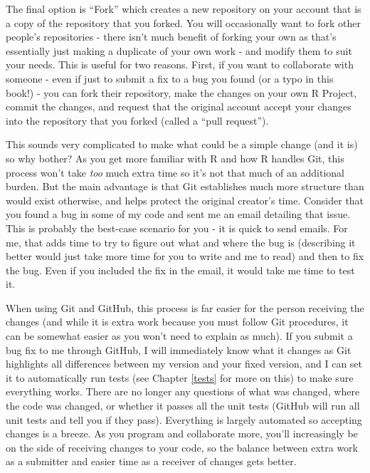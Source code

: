 \documentclass[
]{krantz}
\begin{document}
The final option is ``Fork'' which creates a new repository
on your account that is a copy of the repository that you
forked. You will occasionally want to fork other people's
repositories - there isn't much benefit of forking your own
as that's essentially just making a duplicate of your own
work - and modify them to suit your needs. This is useful
for two reasons. First, if you want to collaborate with
someone - even if just to submit a fix to a bug you found
(or a typo in this book!) - you can fork their repository,
make the changes on your own R Project, commit the changes,
and request that the original account accept your changes
into the repository that you forked (called a ``pull
request'').

This sounds very complicated to make what could be a simple
change (and it is) so why bother? As you get more familiar
with R and how R handles Git, this process won't take
\emph{too} much extra time so it's not that much of an
additional burden. But the main advantage is that Git
establishes much more structure than would exist otherwise,
and helps protect the original creator's time. Consider that
you found a bug in some of my code and sent me an email
detailing that issue. This is probably the best-case
scenario for you - it is quick to send emails. For me, that
adds time to try to figure out what and where the bug is
(describing it better would just take more time for you to
write and me to read) and then to fix the bug. Even if you
included the fix in the email, it would take me time to test
it.

When using Git and GitHub, this process is far easier for
the person receiving the changes (and while it is extra work
because you must follow Git procedures, it can be somewhat
easier as you won't need to explain as much). If you submit
a bug fix to me through GitHub, I will immediately know what
it changes as Git highlights all differences between my
version and your fixed version, and I can set it to
automatically run tests (see Chapter \ref{tests} for more on
this) to make sure everything works. There are no longer any
questions of what was changed, where the code was changed,
or whether it passes all the unit tests (GitHub will run all
unit tests and tell you if they pass). Everything is largely
automated so accepting changes is a breeze. As you program
and collaborate more, you'll increasingly be on the side of
receiving changes to your code, so the balance between extra
work as a submitter and easier time as a receiver of changes
gets better.
\end{document}
